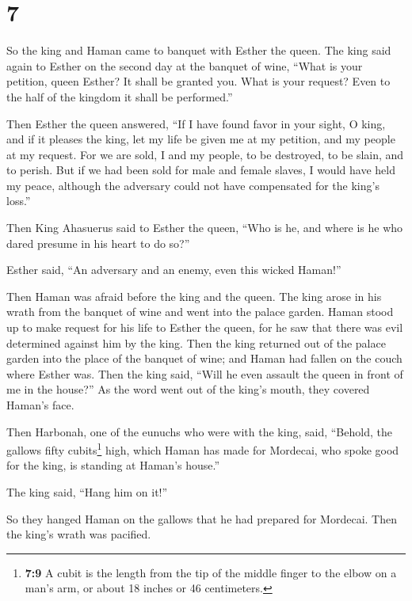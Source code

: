 \hypertarget{section-6}{%
\section{7}\label{section-6}}

 So the king and Haman came to banquet with Esther the
queen.  The king said again to Esther on the second day at
the banquet of wine, ``What is your petition, queen Esther? It shall be
granted you. What is your request? Even to the half of the kingdom it
shall be performed.''

 Then Esther the queen answered, ``If I have found favor
in your sight, O king, and if it pleases the king, let my life be given
me at my petition, and my people at my request.  For we
are sold, I and my people, to be destroyed, to be slain, and to perish.
But if we had been sold for male and female slaves, I would have held my
peace, although the adversary could not have compensated for the king's
loss.''

 Then King Ahasuerus said to Esther the queen, ``Who is
he, and where is he who dared presume in his heart to do so?''

 Esther said, ``An adversary and an enemy, even this
wicked Haman!''

Then Haman was afraid before the king and the queen.  The
king arose in his wrath from the banquet of wine and went into the
palace garden. Haman stood up to make request for his life to Esther the
queen, for he saw that there was evil determined against him by the
king.  Then the king returned out of the palace garden
into the place of the banquet of wine; and Haman had fallen on the couch
where Esther was. Then the king said, ``Will he even assault the queen
in front of me in the house?'' As the word went out of the king's mouth,
they covered Haman's face.

 Then Harbonah, one of the eunuchs who were with the king,
said, ``Behold, the gallows fifty cubits\footnote{\textbf{7:9} A cubit
  is the length from the tip of the middle finger to the elbow on a
  man's arm, or about 18 inches or 46 centimeters.} high, which Haman
has made for Mordecai, who spoke good for the king, is standing at
Haman's house.''

The king said, ``Hang him on it!''

 So they hanged Haman on the gallows that he had prepared
for Mordecai. Then the king's wrath was pacified.

